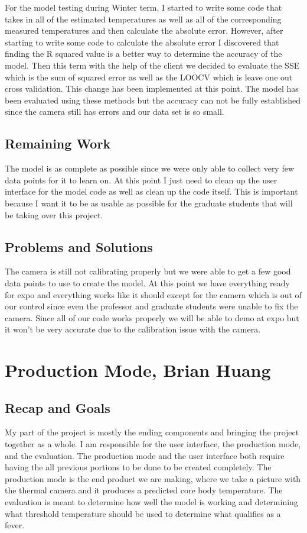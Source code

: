 \documentclass[onecolumn, draftclsnofoot,10pt, compsoc]{IEEEtran}
\begin{document}
For the model testing during Winter term, I started to write some code that takes in all of the estimated temperatures as well as all of the corresponding measured temperatures and then calculate the absolute error. However, after starting to write some code to calculate the absolute error I discovered that finding the R squared value is a better way to determine the accuracy of the model. Then this term with the help of the client we decided to evaluate the SSE which is the sum of squared error as well as the LOOCV which is leave one out cross validation. This change has been implemented at this point. The model has been evaluated using these methods but the accuracy can not be fully established since the camera still has errors and our data set is so small.




\subsection{Remaining Work}

The model is as complete as possible since we were only able to collect very few data points for it to learn on. At this point I just need to clean up the user interface for the model code as well as clean up the code itself. This is important because I want it to be as usable as possible for the graduate students that will be taking over this project. 


\subsection{Problems and Solutions}

The camera is still not calibrating properly but we were able to get a few good data points to use to create the model. At this point we have everything ready for expo and everything works like it should except for the camera which is out of our control since even the professor and graduate students were unable to fix the camera. Since all of our code works properly we will be able to demo at expo but it won’t be very accurate due to the calibration issue with the camera. 


\section{Production Mode, Brian Huang}

\subsection{Recap and Goals}
My part of the project is mostly the ending components and bringing the project together as a whole. I am responsible for the user interface, the production mode, and the evaluation. The production mode and the user interface both require having the all previous portions to be done to be created completely. The production mode is the end product we are making, where we take a picture with the thermal camera and it produces a predicted core body temperature. The evaluation is meant to determine how well the model is working and determining what threshold temperature should be used to determine what qualifies as a fever.
\end{document}
